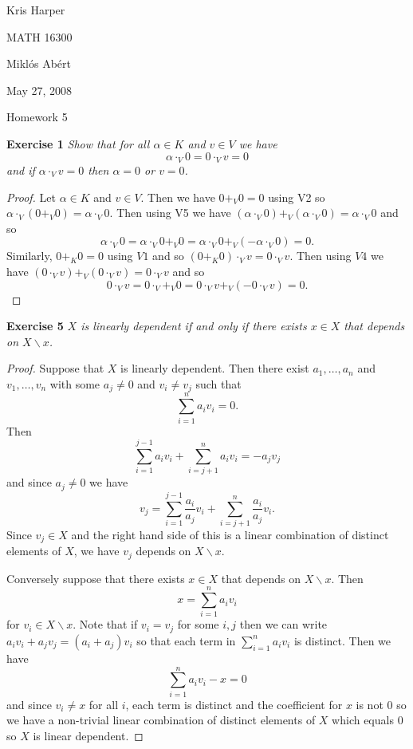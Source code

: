 \documentclass{article}
\begin{document}
\begin{flushright}
Kris Harper

MATH 16300

Mikl\'{o}s Ab\'{e}rt

May 27, 2008
\end{flushright}

\begin{center}
Homework 5
\end{center}

\begin{flushleft}

\textbf{Exercise 1}
\textsl{Show that for all $\alpha \in K$ and $v \in V$ we have
\[
\alpha \cdot_V 0 = 0 \cdot_V v = 0
\]
and if $\alpha \cdot_V v = 0$ then $\alpha = 0$ or $v = 0$.}
\begin{proof}
Let $\alpha \in K$ and $v \in V$. Then we have $0 +_V 0 = 0$ using V2 so $\alpha \cdot_V (0 +_V 0) = \alpha \cdot_V 0$. Then using V5 we have $(\alpha \cdot_V 0) +_V (\alpha \cdot_V 0) = \alpha \cdot_V 0$ and so
\[
\alpha \cdot_V 0 = \alpha \cdot_V 0 +_V 0 = \alpha \cdot_V 0 +_V (-\alpha \cdot_V 0) = 0.
\]
Similarly, $0 +_K 0 = 0$ using $V1$ and so $(0 +_K 0) \cdot_V v = 0 \cdot_V v$. Then using $V4$ we have $(0 \cdot_V v) +_V (0 \cdot_V v) = 0 \cdot_V v$ and so
\[
0 \cdot_V v = 0 \cdot_V +_V 0 = 0 \cdot_V v +_V (-0 \cdot_V v) = 0.
\]
\end{proof}

\textbf{Exercise 5}
\textsl{$X$ is linearly dependent if and only if there exists $x \in X$ that depends on $X \backslash x$.}
\begin{proof}
Suppose that $X$ is linearly dependent. Then there exist $a_1, \dots , a_n$ and $v_1, \dots , v_n$ with some $a_j \neq 0$ and $v_i \neq v_j$ such that
\[
\sum_{i=1}^n a_i v_i = 0.
\]
Then
\[
\sum_{i=1}^{j-1} a_i v_i + \sum_{i=j+1}^{n} a_i v_i = -a_j v_j
\]
and since $a_j \neq 0$ we have
\[
v_j = \sum_{i=1}^{j-1} \frac{a_i}{a_j} v_i + \sum_{i=j+1}^{n} \frac{a_i}{a_j} v_i.
\]
Since $v_j \in X$ and the right hand side of this is a linear combination of distinct elements of $X$, we have $v_j$  depends on $X \backslash x$.\newline

Conversely suppose that there exists $x \in X$ that depends on $X \backslash x$. Then
\[
x = \sum_{i=1}^{n} a_i v_i
\]
for $v_i \in X \backslash x$. Note that if $v_i = v_j$ for some $i, j$ then we can write $a_i v_i + a_j v_j = (a_i + a_j) v_i$ so that each term in $\sum_{i=1}^{n} a_i v_i$ is distinct. Then we have
\[
\sum_{i=1}^{n} a_i v_i - x = 0
\]
and since $v_i \neq x$ for all $i$, each term is distinct and the coefficient for $x$ is not $0$ so we have a non-trivial linear combination of distinct elements of $X$ which equals $0$ so $X$ is linear dependent.
\end{proof}


\end{flushleft}
\end{document}
